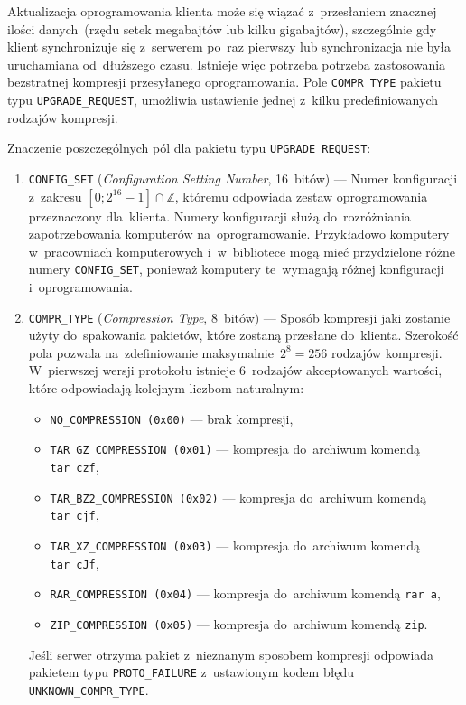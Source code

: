 \documentclass[thesis]{subfiles}
\begin{document}
Aktualizacja oprogramowania klienta może się wiązać z~przesłaniem znacznej ilości danych~(rzędu setek megabajtów lub kilku gigabajtów), szczególnie gdy klient synchronizuje się z~serwerem po~raz pierwszy lub synchronizacja nie była uruchamiana od~dłuższego czasu. Istnieje więc potrzeba potrzeba zastosowania bezstratnej kompresji przesyłanego oprogramowania. Pole \texttt{COMPR\_TYPE} pakietu typu \texttt{UPGRADE\_REQUEST}, umożliwia ustawienie jednej z~kilku predefiniowanych rodzajów kompresji.

Znaczenie poszczególnych pól dla pakietu typu \texttt{UPGRADE\_REQUEST}:\mynobreakpar
\begin{enumerate}
	\item \texttt{CONFIG\_SET} (\emph{Configuration Setting Number}, 16~bitów) --- Numer konfiguracji z~zakresu $[0;2^{16}-1]\cap\mathbb{Z}$, któremu odpowiada zestaw oprogramowania przeznaczony dla~klienta. Numery konfiguracji służą do~rozróżniania zapotrzebowania komputerów na~oprogramowanie. Przykładowo komputery w~pracowniach komputerowych i~w~bibliotece mogą mieć przydzielone różne numery \texttt{CONFIG\_SET}, ponieważ komputery te~wymagają różnej konfiguracji i~oprogramowania.
	\item \texttt{COMPR\_TYPE} (\emph{Compression Type}, 8~bitów) --- Sposób kompresji jaki zostanie użyty do~spakowania pakietów, które zostaną przesłane do~klienta. Szerokość pola pozwala na~zdefiniowanie maksymalnie~$2^8=256$ rodzajów kompresji. W~pierwszej wersji protokołu istnieje 6~rodzajów akceptowanych wartości, które odpowiadają kolejnym liczbom naturalnym:
		\begin{itemize}
			\item \texttt{NO\_COMPRESSION (0x00)} --- brak kompresji,
			\item \texttt{TAR\_GZ\_COMPRESSION (0x01)} --- kompresja do~archiwum  komendą \texttt{tar~czf},
			\item \texttt{TAR\_BZ2\_COMPRESSION (0x02)} --- kompresja do~archiwum  komendą \texttt{tar~cjf},
			\item \texttt{TAR\_XZ\_COMPRESSION (0x03)} --- kompresja do~archiwum  komendą \texttt{tar~cJf},
			\item \texttt{RAR\_COMPRESSION (0x04)} --- kompresja do~archiwum  komendą \texttt{rar~a},
			\item \texttt{ZIP\_COMPRESSION (0x05)} --- kompresja do~archiwum  komendą \texttt{zip}.
		\end{itemize}
	Jeśli serwer otrzyma pakiet z~nieznanym sposobem kompresji odpowiada pakietem typu \texttt{PROTO\_FAILURE} z~ustawionym kodem błędu \texttt{UNKNOWN\_COMPR\_TYPE}.

\end{enumerate}
\end{document}
